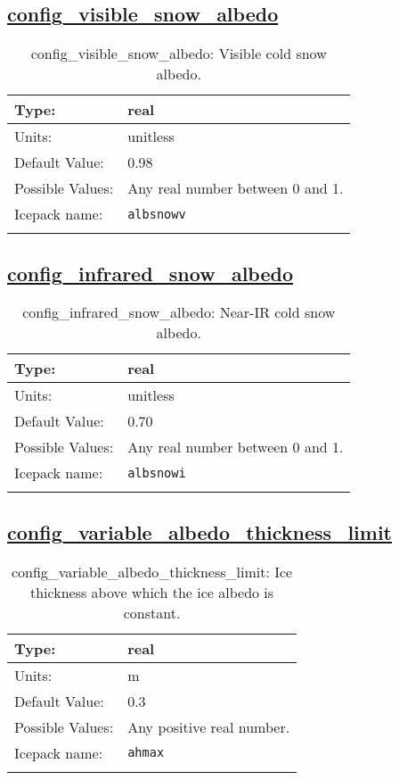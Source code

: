 \subsection[config\_visible\_snow\_albedo]{\hyperref[sec:nm_tab_shortwave]{config\_visible\_snow\_albedo}}
\label{subsec:nm_sec_config_visible_snow_albedo}
\begin{center}
\begin{longtable}{| p{2.0in} || p{4.0in} |}
    \hline
    Type: & real \\
    \hline
    Units: & \si{unitless} \\
    \hline
    Default Value: & 0.98 \\
    \hline
    Possible Values: & Any real number between 0 and 1. \\
    \hline
    Icepack name: & \verb+albsnowv+ \\
    \hline
    \caption{config\_visible\_snow\_albedo: Visible cold snow albedo.}
\end{longtable}
\end{center}
\subsection[config\_infrared\_snow\_albedo]{\hyperref[sec:nm_tab_shortwave]{config\_infrared\_snow\_albedo}}
\label{subsec:nm_sec_config_infrared_snow_albedo}
\begin{center}
\begin{longtable}{| p{2.0in} || p{4.0in} |}
    \hline
    Type: & real \\
    \hline
    Units: & \si{unitless} \\
    \hline
    Default Value: & 0.70 \\
    \hline
    Possible Values: & Any real number between 0 and 1. \\
    \hline
    Icepack name: & \verb+albsnowi+ \\
    \hline
    \caption{config\_infrared\_snow\_albedo: Near-IR cold snow albedo.}
\end{longtable}
\end{center}
\subsection[config\_variable\_albedo\_thickness\_limit]{\hyperref[sec:nm_tab_shortwave]{config\_variable\_albedo\_thickness\_limit}}
\label{subsec:nm_sec_config_variable_albedo_thickness_limit}
\begin{center}
\begin{longtable}{| p{2.0in} || p{4.0in} |}
    \hline
    Type: & real \\
    \hline
    Units: & \si{m} \\
    \hline
    Default Value: & 0.3 \\
    \hline
    Possible Values: & Any positive real number. \\
    \hline
    Icepack name: & \verb+ahmax+ \\
    \hline
    \caption{config\_variable\_albedo\_thickness\_limit: Ice thickness above which the ice albedo is constant.}
\end{longtable}
\end{center}
